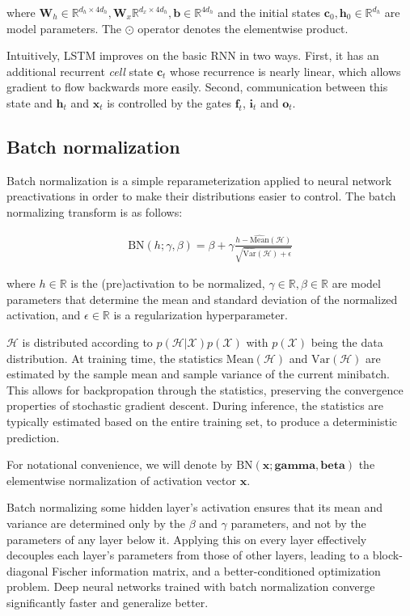 \documentclass{article} %
\newcommand{\vect}[1]{\mathbf{#1}}
\newcommand{\ewprod}{\odot}
\newcommand{\reals}{\mathbb{R}}
\begin{document}
where $\vect{W}_h \in \reals^{d_h \times 4 d_h}, \vect{W}_x \reals^{d_x \times 4 d_h}, \vect{b} \in \reals^{4 d_h}$ and the initial states $\vect{c}_0, \vect{h}_0 \in \reals^{d_h}$ are model parameters.
The $\ewprod$ operator denotes the elementwise product.

Intuitively, LSTM improves on the basic RNN in two ways.
First, it has an additional recurrent \emph{cell} state $\vect{c}_t$ whose recurrence is nearly linear, which allows gradient to flow backwards more easily.
Second, communication between this state and $\vect{h}_t$ and $\vect{x}_t$ is controlled by the gates $\vect{f}_t$, $\vect{i}_t$ and $\vect{o}_t$.

\subsection{Batch normalization}

Batch normalization is a simple reparameterization applied to neural network preactivations in order to make their distributions easier to control.
The batch normalizing transform is as follows:

\begin{align}
\mathrm{BN}(h; \gamma, \beta) =
  \beta + \gamma
  \frac{h -   \widehat{\mathrm{Mean}}(\mathcal{H})}
       {\sqrt{\widehat{\mathrm{Var }}(\mathcal{H}) + \epsilon}}
\end{align}

where $h \in \reals$ is the (pre)activation to be normalized, $\gamma \in \reals, \beta \in \reals$ are model parameters that determine the mean and standard deviation of the normalized activation, and $\epsilon \in \reals$ is a regularization hyperparameter.

$\mathcal{H}$ is distributed according to $p(\mathcal{H}|\mathcal{X}) p(\mathcal{X})$ with $p(\mathcal{X})$ being the data distribution.
At training time, the statistics $\mathrm{Mean}(\mathcal{H})$ and $\mathrm{Var}(\mathcal{H})$ are estimated by the sample mean and sample variance of the current minibatch.
This allows for backpropation through the statistics, preserving the convergence properties of stochastic gradient descent.
During inference, the statistics are typically estimated based on the entire training set, to produce a deterministic prediction.

For notational convenience, we will denote by $\mathrm{BN}(\vect{x}; \vect{gamma}, \vect{beta})$ the elementwise normalization of activation vector $\vect{x}$.

Batch normalizing some hidden layer's activation ensures that its mean and variance are determined only by the $\beta$ and $\gamma$ parameters, and not by the parameters of any layer below it.
Applying this on every layer effectively decouples each layer's parameters from those of other layers, leading to a block-diagonal Fischer information matrix, and a better-conditioned optimization problem.
Deep neural networks trained with batch normalization converge significantly faster and generalize better.
\end{document}
